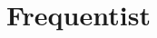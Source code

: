 \documentclass[10pt]{beamer}
\begin{document}
\begin{frame}
\end{frame}

\section{Frequentist}

\begin{frame}
\end{frame}

%
%
%
%
\end{document}
